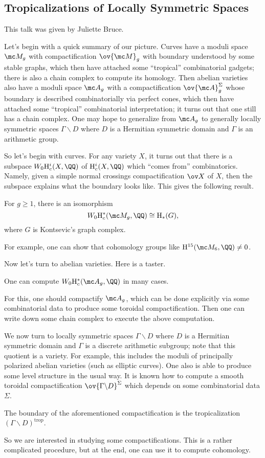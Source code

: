 \documentclass{article}
\begin{document}
\subsection{Tropicalizations of Locally Symmetric Spaces}
This talk was given by Juliette Bruce.

Let's begin with a quick summary of our picture. Curves have a moduli space $\mc M_g$ with compactification $\ov{\mc M}_g$ with boundary understood by some stable graphs, which then have attached some ``tropical'' combinatorial gadgets; there is also a chain complex to compute its homology. Then abelian varieties also have a moduli space $\mc A_g$ with a compactification $\ov{\mc A}_g^\Sigma$ whose boundary is described combinatorially via perfect cones, which then have attached some ``tropical'' combinatorial interpretation; it turns out that one still has a chain complex. One may hope to generalize from $\mc A_g$ to generally locally symmetric spaces $\Gamma\backslash D$ where $D$ is a Hermitian symmetric domain and $\Gamma$ is an arithmetic group.

So let's begin with curves. For any variety $X$, it turns out that there is a subspace $W_0\mathrm H^i_c(X,\QQ)$ of $\mathrm H^i_c(X,\QQ)$ which ``comes from'' combinatorics. Namely, given a simple normal crossings compactification $\ov X$ of $X$, then the subspace explains what the boundary looks like. This gives the following result.
\begin{theorem}
	For $g\ge1$, there is an isomorphism
	\[W_0\mathrm H^*_c(\mc M_g,\QQ)\cong\mathrm H_*(G),\]
	where $G$ is Kontsevic's graph complex.
\end{theorem}
For example, one can show that cohomology groups like $\mathrm H^{15}(\mc M_6,\QQ)\ne0$.

Now let's turn to abelian varieties. Here is a taster.
\begin{theorem}
	One can compute $W_0\mathrm H^*_c(\mc A_g,\QQ)$ in many cases.
\end{theorem}
For this, one should compactify $\mc A_g$, which can be done explicitly via some combinatorial data to produce some toroidal compactification. Then one can write down some chain complex to execute the above computation.

We now turn to locally symmetric spaces $\Gamma\backslash D$ where $D$ is a Hermitian symmetric domain and $\Gamma$ is a discrete arithmetic subgroup; note that this quotient is a variety. For example, this includes the moduli of principally polarized abelian varieties (such as elliptic curves). One also is able to produce some level structure in the usual way. It is known how to compute a smooth toroidal compactification $\ov{\Gamma\backslash D}^\Sigma$ which depends on some combinatorial data $\Sigma$.
\begin{definition}
	The boundary of the aforementioned compactification is the tropicalization $(\Gamma\backslash D)^{\mathrm{trop}}$.
\end{definition}
So we are interested in studying some compactifications. This is a rather complicated procedure, but at the end, one can use it to compute cohomology.
\end{document}

